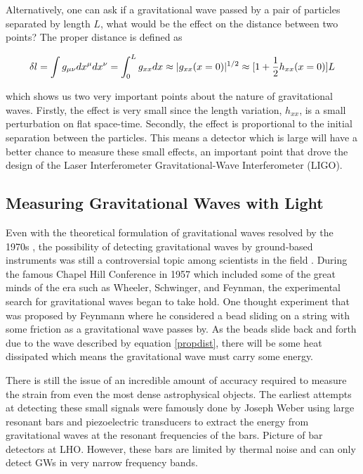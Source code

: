 	Alternatively, one can ask if a gravitational wave passed by a pair of particles separated by length $L$, what would be the effect on the distance between two points?  The proper distance is defined as

	\begin{equation}\label{propdist}
	\delta l
	= \int{g_{\mu \nu} dx^{\mu} dx^{\nu}} \\
	= \int_{0}^{L}{g_{xx} {d}x}\\
	\approx |g_{xx}(x=0)|^{1/2}\\
	\approx [ 1 + \frac{1}{2} h_{xx}(x=0)] L
	\end{equation} 
	
	which shows us two very important points about the nature of gravitational waves.  Firstly, the effect is very small since the length variation, $h_{xx}$, is a small perturbation on flat space-time.  Secondly, the effect is proportional to the initial separation between the particles. This means a detector which is large will have a better chance to measure these small effects, an important point that drove the design of the Laser Interferometer Gravitational-Wave Interferometer (LIGO).
	
	\subsection{Measuring Gravitational Waves with Light}\label{measuringGWs}
	Even with the theoretical formulation of gravitational waves resolved by the 1970s \cite{PiraniPhysicalSignificance}, the possibility of detecting gravitational waves by ground-based instruments was still a controversial topic among scientists in the field \cite{CollinsGravity}.  During the famous Chapel Hill Conference in 1957 which included some of the great minds of the era such as Wheeler, Schwinger, and Feynman, the experimental search for gravitational waves began to take hold.  One thought experiment that was proposed by Feynmann \cite{SmootBrief} where he considered a bead sliding on a string with some friction as a gravitational wave passes by.  As the beads slide back and forth due to the wave described by equation \ref{propdist}, there will be some heat dissipated which means the gravitational wave must carry some energy.
	
	There is still the issue of an incredible amount of accuracy required to measure the strain from even the most dense astrophysical objects. The earliest attempts at detecting these small signals were famously done by Joseph Weber using large resonant bars and piezoelectric transducers to extract the energy from gravitational waves at the resonant frequencies of the bars. Picture of bar detectors at LHO.  However, these bars are limited by thermal noise and can only detect GWs in very narrow frequency bands. 
	
